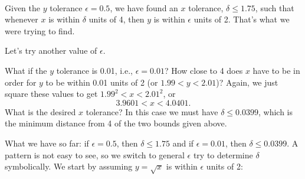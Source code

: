 {{
		\\
		\noindent
	}

		

Given the $y$ tolerance $\epsilon =0.5$, we have found an $x$ tolerance, $\delta \leq 1.75$, such that whenever $x$ is within $\delta$ units of 4, then $y$ is within $\epsilon$ units of 2.  That's what we were trying to find.\bigskip
  
Let's try another value of $\epsilon$.\bigskip

What if the $y$ tolerance is 0.01, i.e.,  $\epsilon =0.01$?  How close to 4 does $x$ have to be in order for $y$ to be within 0.01 units of 2 (or $1.99 < y < 2.01$)?  Again, we just square these values to get
$1.99^2 < x < 2.01^2$, or 
\[3.9601 < x < 4.0401\text{.}\]
What is the desired $x$ tolerance?  In this case we must have $\delta \leq 0.0399$, which is the minimum distance from 4 of the two bounds given above.  %

What we have so far: if $\epsilon =0.5$, then $\delta \leq 1.75$ and if $\epsilon = 0.01$, then $\delta \leq 0.0399$. A pattern is not easy to see, so we switch to general $\epsilon$ try to determine $\delta$ symbolically.  We start by assuming $y=\sqrt{x}$ is within $\epsilon$ units of 2:

}
